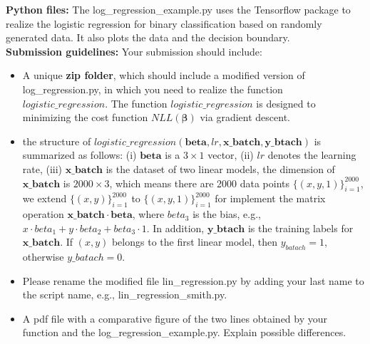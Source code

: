 \documentclass[11pt,oneside,a4paper]{article}
\begin{document}
\begin{enumerate}
   \textbf{Python files:} The log\_regression\_example.py uses the Tensorflow package to realize the logistic regression for binary classification based on randomly generated data. It also plots the data and the decision boundary.
  \\
  \textbf{Submission guidelines:} Your submission should include:
  \begin{itemize}
  	\item A unique \textbf{zip folder}, which should include a modified version of log\_regression.py, in which you need to realize the function $logistic\_regression$. 
	The function $logistic\_regression$ is designed to minimizing the cost function $NLL(\pmb{\beta})$ via gradient descent. 
	\item the structure of $logistic\_regression(\boldsymbol{beta}, lr, \boldsymbol{x\_batch}, \boldsymbol{y\_btach})$ is summarized as follows: (i) $\boldsymbol{beta}$ is a $3 \times 1$ vector, (ii) $lr$ denotes the learning rate, (iii) $\boldsymbol{x\_batch}$ is the dataset of two linear models, the dimension of $\boldsymbol{x\_batch}$ is $2000 \times 3$, which means there are 2000 data points $\{(x, y, 1)\}_{i=1}^{2000}$, we extend $\{(x, y)\}_{i=1}^{2000}$ to $\{(x, y, 1)\}_{i=1}^{2000}$ for implement the matrix operation $\boldsymbol{x\_batch} \cdot \boldsymbol{beta}$, where $beta_3$ is the bias, e.g., $x \cdot beta_1 + y \cdot beta_2 + beta_3 \cdot 1$. In addition, $\boldsymbol{y\_btach}$ is the training labels for $\boldsymbol{x\_batch}$. If $(x, y)$ belongs to the first linear model, then $y_{batach} = 1$, otherwise $y\_batach = 0$.
	\item Please rename the modified file lin\_regression.py by adding your last name to the script name, e.g., lin\_regression\_smith.py.
  	\item A pdf file with a comparative figure of the two lines obtained by your function and the log\_regression\_example.py. Explain possible differences.
  \end{itemize}
  

\end{enumerate}
\end{document}
